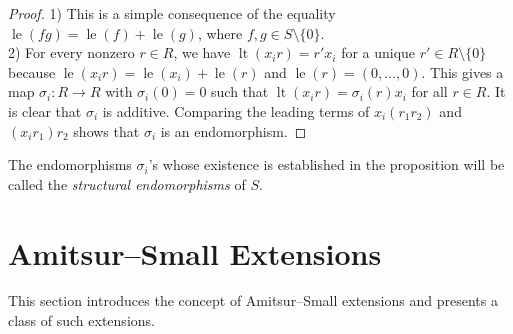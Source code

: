 \documentclass[11pt,a4paper]{article}
\theoremstyle{theorem}
\numberwithin{equation}{section}
\newcommand{\s}{\sigma}
\begin{document}
		\begin{proof}
			1) This is a simple consequence of  the equality $\operatorname{le}(fg)=\operatorname{le}(f)+\operatorname{le}(g)$, where $f,g\in S\setminus\{0\}$.\\
			2) For every nonzero $r\in R$,   we have $\operatorname{lt}(x_ir)=r'x_i$ for a unique $r'\in R\setminus\{0\}$ because $\operatorname{le}(x_ir)=\operatorname{le}(x_i)+\operatorname{le}(r)$ and $\operatorname{le}(r)=(0,\dots,0)$. This gives a map $\s_i:R\to R$ with $\s_i(0)=0$ such that $\operatorname{lt}(x_ir)=\s_i(r)x_i$ for all $r\in R$. It is clear that $\s_i$ is additive. Comparing the leading terms of $x_i (r_1r_2)$ and $(x_ir_1)r_2$ shows that $\s_i$ is an endomorphism.  
		\end{proof}
		The endomorphisms $\s_i$'s whose existence is established in the proposition will be called the \textit{structural endomorphisms} of $S$. 	

	\section{Amitsur--Small Extensions}\label{sec: amitsur-small}
	This section introduces the concept of 	Amitsur--Small extensions and presents a class of such extensions. 
\end{document}
